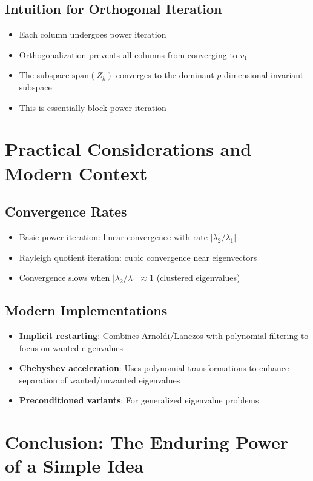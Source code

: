\documentclass[11pt]{article}
\begin{document}
\subsection{Intuition for Orthogonal Iteration}
\begin{itemize}
\item Each column undergoes power iteration
\item Orthogonalization prevents all columns from converging to $v_1$
\item The subspace $\text{span}(Z_k)$ converges to the dominant $p$-dimensional invariant subspace
\item This is essentially block power iteration
\end{itemize}

\section{Practical Considerations and Modern Context}

\subsection{Convergence Rates}
\begin{itemize}
\item Basic power iteration: linear convergence with rate $|\lambda_2/\lambda_1|$
\item Rayleigh quotient iteration: cubic convergence near eigenvectors
\item Convergence slows when $|\lambda_2/\lambda_1| \approx 1$ (clustered eigenvalues)
\end{itemize}

\subsection{Modern Implementations}
\begin{itemize}
\item \textbf{Implicit restarting}: Combines Arnoldi/Lanczos with polynomial filtering to focus on wanted eigenvalues
\item \textbf{Chebyshev acceleration}: Uses polynomial transformations to enhance separation of wanted/unwanted eigenvalues
\item \textbf{Preconditioned variants}: For generalized eigenvalue problems
\end{itemize}

\section*{Conclusion: The Enduring Power of a Simple Idea}
\end{document}
